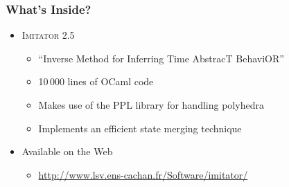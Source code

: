 \documentclass[professionalfont]{beamer}
\newcommand{\couleur}[1]{\textcolor{couleurimportante}{#1}}
\newcommand{\refer}[1]{\textcolor{couleurref}{\cite{#1}}}
\newcommand{\imitator}{\textsc{Imitator}}
\newcommand{\ocaml}{OCaml}
\begin{document}
\begin{frame}
 \frametitle{What's Inside?}
\begin{itemize}
	\item \couleur{\imitator{}} 2.5 \refer{afks12}

	\begin{itemize}
		\item ``\couleur{I}nverse \couleur{M}ethod for \couleur{I}nferring \couleur{T}ime \couleur{A}bstrac\couleur{T} Behavi\couleur{OR}''
		\item 10\,000 lines of \couleur{\ocaml{}} code
		\item Makes use of the \couleur{PPL} library for handling polyhedra \refer{bhz08}
		\item Implements an efficient state merging technique\refer{AFS12}
	\end{itemize}

	\bigskip
% 
% 

	\bigskip

	\item Available on the Web

	\begin{itemize}
		\item \couleur{\url{http://www.lsv.ens-cachan.fr/Software/imitator/}}
	\end{itemize}

% 	
% 


\end{itemize}

\end{frame}
\end{document}
